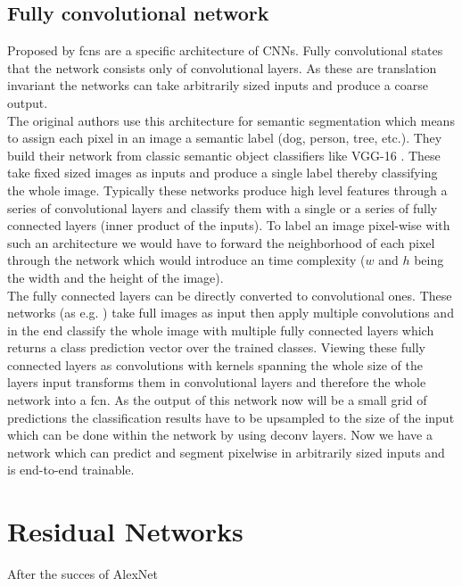 \subsection{Fully convolutional network} %
\label{sub:conepts:fcn:fcn}
Proposed by \citet{long_fully_2015} \glspl{fcn} are a specific architecture of CNNs. Fully convolutional states that the network consists only of convolutional layers. As these are translation invariant the networks can take arbitrarily sized inputs and produce a coarse output.\\
The original authors use this architecture for semantic segmentation which means to assign each pixel in an image a semantic label (dog, person, tree, etc.). They build their network from classic semantic object classifiers like VGG-16 \citep{simonyan_very_2014}. These take fixed sized images as inputs and produce a single label thereby classifying the whole image. Typically these networks produce high level features through a series of convolutional layers and classify them with a single or a series of fully connected layers (inner product of the inputs). To label an image pixel-wise with such an architecture we would have to forward the neighborhood of each pixel through the network which would introduce an  time complexity ($w$ and $h$ being the width and the height of the image).\\
The fully connected layers can be directly converted to convolutional ones.
 These networks (as e.g. ) take full images as input then apply multiple convolutions and in the end classify the whole image with multiple fully connected layers which returns a class prediction vector over the trained classes. Viewing these fully connected layers as convolutions with kernels spanning the whole size of the layers input transforms them in convolutional layers and therefore the whole network into a \gls{fcn}. As the output of this network now will be a small grid of predictions the classification results have to be upsampled to the size of the input which can be done within the network by using deconv layers. Now we have a network which can predict and segment pixelwise in arbitrarily sized inputs and is end-to-end trainable.

\section{Residual Networks}
\label{sec:concepts:resnet}
After the succes of AlexNet \citep{krizhevsky_imagenet_2012}
